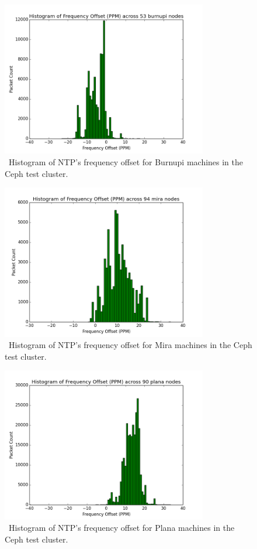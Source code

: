 \begin{figure}[!htbp]
  \centering
  \caption{~Histogram of NTP's frequency offset for Burnupi machines in the Ceph test cluster.}
  \label{fig:burnupi-hist}
  \includegraphics[width=0.8\textwidth]{burnupi-freq-offset.png}
\end{figure}

\begin{figure}[!htbp]
  \centering
  \caption{~Histogram of NTP's frequency offset for Mira machines in the Ceph test cluster.}
  \label{fig:mira-hist}
  \includegraphics[width=0.8\textwidth]{mira-freq-offset.png}
\end{figure}

\begin{figure}[!htbp]
  \centering
  \caption{~Histogram of NTP's frequency offset for Plana machines in the Ceph test cluster.}
  \label{fig:plana-hist}
  \includegraphics[width=0.8\textwidth]{plana-freq-offset.png}
\end{figure}

